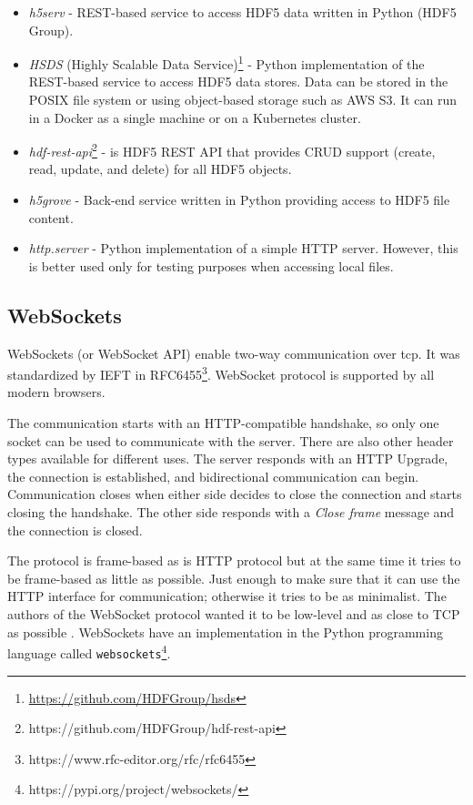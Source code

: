 \begin{itemize}
    \item \emph{h5serv} - REST-based service to access HDF5 data written in Python (HDF5 Group).
    \item \emph{HSDS} (Highly Scalable Data Service)\footnote{\url{https://github.com/HDFGroup/hsds}} - Python implementation of the REST-based service to access HDF5 data stores. Data can be stored in the POSIX file system or using object-based storage such as AWS S3. It can run in a Docker as a single machine or on a Kubernetes cluster.
    \item \emph{hdf-rest-api}\footnote{https://github.com/HDFGroup/hdf-rest-api} - is HDF5 REST API that provides CRUD support (create, read, update, and delete) for all HDF5 objects.
    \item \emph{h5grove} - Back-end service written in Python providing access to HDF5 file content.
    \item \emph{http.server} - Python implementation of a simple HTTP server. However, this is better used only for testing purposes when accessing local files.
\end{itemize}


\subsection{WebSockets}\label{txt.design.websocket}

WebSockets (or WebSocket API) enable two-way communication over \ac{tcp}. It was standardized by IEFT in RFC6455\footnote{https://www.rfc-editor.org/rfc/rfc6455}. WebSocket protocol is supported by all modern browsers.

The communication starts with an HTTP-compatible handshake, so only one socket can be used to communicate with the server. There are also other header types available for different uses. The server responds with an HTTP Upgrade, the connection is established, and bidirectional communication can begin. Communication closes when either side decides to close the connection and starts closing the handshake. The other side responds with a \textit{Close frame} message and the connection is closed. 

The protocol is frame-based as is HTTP protocol but at the same time it tries to be frame-based as little as possible. Just enough to make sure that it can use the HTTP interface for communication; otherwise it tries to be as minimalist. The authors of the WebSocket protocol wanted it to be low-level and as close to TCP as possible \cite{websock}. WebSockets have an implementation in the Python programming language called \verb|websockets|\footnote{https://pypi.org/project/websockets/}.

